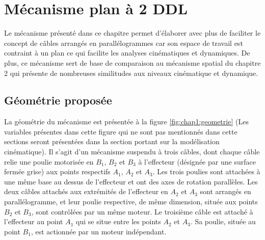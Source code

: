 \chapter{Mécanisme plan à 2 DDL}     %

Le mécanisme présenté dans ce chapitre permet d'élaborer avec plus de faciliter le concept de câbles arrangés en parallélogrammes car son espace de travail est contraint à un plan ce qui facilite les analyses cinématiques et dynamiques. De plus, ce mécanisme sert de base de comparaison au mécanisme spatial du chapitre 2 qui présente de nombreuses similitudes aux niveaux cinématique et dynamique. 

\section{Géométrie proposée}
La géométrie du mécanisme est présentée à la figure \ref{fig:chap1:geometrie} (Les variables présentes dans cette figure qui ne sont pas mentionnés dans cette sections seront présentées dans la section portant sur la modélisation cinématique). Il s'agit d'un mécanisme suspendu à trois câbles, dont chaque câble relie une poulie motorisée en $B_1$, $B_2$ et $B_3$ à l'effecteur (désignée par une surface fermée grise) aux points respectifs $A_1$, $A_2$ et $A_3$. Les trois poulies sont attachées à une même base au dessus de l'effecteur et ont des axes de rotation parallèles. Les deux câbles attachés aux extrémités de l'effecteur en $A_2$ et $A_3$ sont arrangés en parallélogramme, et leur poulie respective, de même dimension, située aux points $B_2$ et $B_3$, sont contrôlées par un même moteur. Le troisième câble est attaché à l'effecteur au point $A_1$ qui se situe entre les points $A_2$ et $A_3$. Sa poulie, située au point $B_1$, est actionnée par un moteur indépendant. \par

